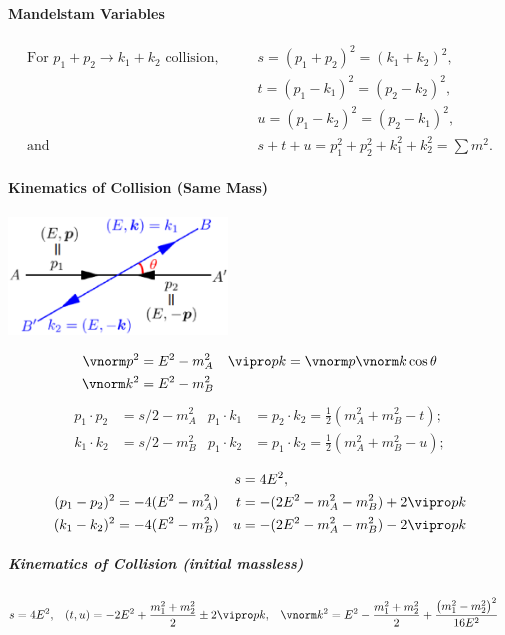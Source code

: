 \paragraph{Mandelstam Variables}
\begin{align*}
\text{For $p_1 + p_2 \to k_1 + k_2$ collision,}\qquad
&s=(p_1+p_2)^2=(k_1+k_2)^2,\\
&t=(p_1-k_1)^2=(p_2-k_2)^2,\\
&u=(p_1-k_2)^2=(p_2-k_1)^2,\\
\text{and}\qquad&s+t+u=p_1^2+p_2^2+k_1^2+k_2^2=\sum m^2.
\end{align*}

\paragraph{Kinematics of Collision (Same Mass)}\mbox{}\par
\begin{minipage}{167pt}
\includegraphics[width=165pt]{graphics/collision.eps}
\end{minipage}
\begin{minipage}{270pt}
\begin{align*}
 \vnorm p ^2 &= E^2-m_A^2 & \vipro pk &=\vnorm p \vnorm k\cos\theta\\
 \vnorm k ^2 &= E^2-m_B^2
\end{align*}\vspace{-27pt}
\begin{align*}
 p_1 \cdot p_2&=s/2-m_A^2 & p_1\cdot k_1  &= p_2 \cdot k_2 = \tfrac12(m_A^2+m_B^2-t);\\
 k_1 \cdot k_2&=s/2-m_B^2 & p_1 \cdot k_2 &= p_1 \cdot k_2 = \tfrac12(m_A^2+m_B^2-u);
\end{align*}\vskip-10pt
\end{minipage}
\begin{align*}
&&  s&= 4E^2,\\
 (p_1-p_2)^2&=-4(E^2-m_A^2)&
 t&= -(2E^2-m_A^2-m_B^2)+2\vipro pk\\
 (k_1-k_2)^2&=-4(E^2-m_B^2)&
 u&= -(2E^2-m_A^2-m_B^2)-2\vipro pk\\
\end{align*}
\subparagraph{Kinematics of Collision (initial massless)}\mbox{}\par
\begin{align*}
 s&= 4E^2,&
 (t,u) &= -2E^2+\frac{m_1^2+m_2^2}{2}\pm2\vipro pk,&
 \vnorm k ^2 &= E^2-\frac{m_1^2+m_2^2}{2}+\frac{\left(m_1^2-m_2^2\right)^2}{16 E^2}
\end{align*}
\newpage
